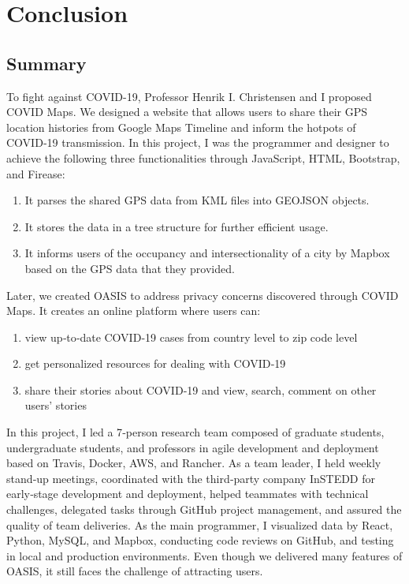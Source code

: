 \documentclass{ucsdreport}
\begin{document}
\section{Conclusion}

\subsection{Summary}
To fight against COVID-19, Professor Henrik I. Christensen and I proposed 
COVID Maps. We designed a website that allows users to share their GPS location
histories from Google Maps Timeline and inform the hotpots of COVID‑19 
transmission. In this project, I was the programmer and designer to achieve 
the following three functionalities through JavaScript, HTML, Bootstrap, and 
Firease:
\begin{enumerate}
    \item It parses the shared GPS data from KML files into GEOJSON objects.
    \item It stores the data in a tree structure for further efficient usage.
    \item It informs users of the occupancy and intersectionality of a city 
    by Mapbox based on the GPS data that they provided.
\end{enumerate}

Later, we created OASIS to address privacy concerns discovered through COVID 
Maps. It creates an online platform where users can:
\begin{enumerate}
    \item view up‑to‑date COVID‑19 cases from country level to zip code level
    \item get personalized resources for dealing with COVID‑19
    \item share their stories about COVID‑19 and view, search, comment on other
    users' stories
\end{enumerate}
In  this project,  I led a 7‑person research team composed of graduate 
students, undergraduate students, and professors in agile development and 
deployment based on Travis, Docker, AWS, and Rancher. As a team leader,
I held weekly stand‑up meetings, coordinated with the third‑party company
InSTEDD for early‑stage development and deployment, helped teammates with
technical challenges, delegated tasks through GitHub project management, and
assured the quality of team deliveries. As the main programmer, I visualized
data by React, Python, MySQL, and Mapbox, conducting code reviews on GitHub, 
and testing in local and production environments. Even though we delivered
many features of OASIS, it still faces the challenge of attracting users. 
\end{document}

